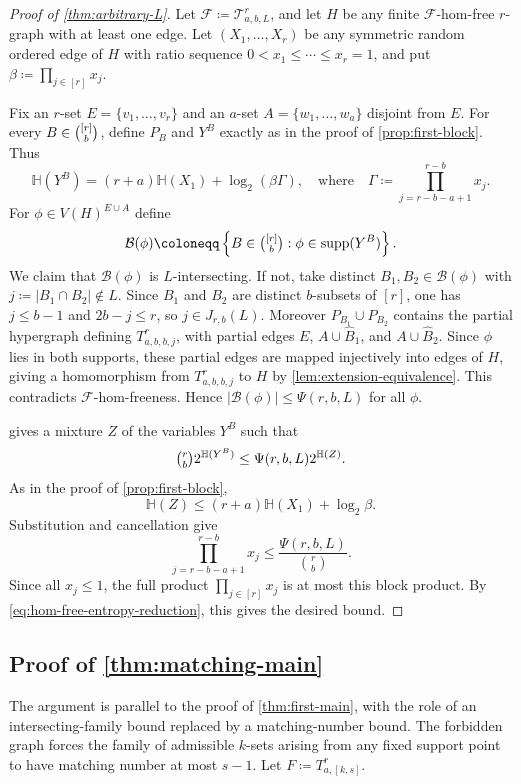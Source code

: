 \documentclass[10pt,a4paper]{article}
\theoremstyle{plain}
\theoremstyle{definition}
\theoremstyle{plain}
\DeclareMathOperator{\supp}{supp}
\newcommand{\calB}{\mathcal B}
\newcommand{\calF}{\mathcal F}
\newcommand{\calT}{\mathcal T}
\newcommand{\HH}{\mathbb H}
\begin{document}
\begin{proof}[Proof of \cref{thm:arbitrary-L}]
Let $\calF\coloneqq\calT^r_{a,b,L}$, and let $H$ be any finite $\calF$-hom-free
$r$-graph with at least one edge.  Let $(X_1,\ldots,X_r)$ be any symmetric random ordered edge of $H$
with ratio sequence $0<x_1\le\cdots\le x_r=1$, and put
$\beta\coloneqq\prod_{j\in [r]} x_j$.

Fix an $r$-set $E=\{v_1,\ldots,v_r\}$ and an $a$-set
$A=\{w_1,\ldots,w_a\}$ disjoint from $E$.  For every
$B\in\tbinom{[r]}{b}$, define $P_B$ and $Y^B$ exactly as in the proof of
\cref{prop:first-block}.  Thus
\[
        \HH(Y^B)=(r+a)\HH(X_1)+\log_2(\beta\Gamma),
        \quad\text{where}\quad
        \Gamma\coloneqq\prod_{j=r-b-a+1}^{r-b}x_j.
\]
For $\phi\in V(H)^{E\cup A}$ define
\[
        \calB(\phi)\coloneqq\left\{B\in\tbinom{[r]}{b}:\phi\in\supp(Y^B)\right\}.
\]
We claim that $\calB(\phi)$ is $L$-intersecting.  If not, take distinct
$B_1,B_2\in\calB(\phi)$ with $j\coloneqq |B_1\cap B_2|\notin L$.  Since
$B_1$ and $B_2$ are distinct $b$-subsets of $[r]$, one has $j\le b-1$ and
$2b-j\le r$, so $j\in J_{r,b}(L)$.  Moreover
$P_{B_1}\cup P_{B_2}$ contains the partial hypergraph defining
$T^r_{a,b,b,j}$, with partial edges $E$, $A\cup\hat{B}_1$, and
$A\cup\hat{B}_2$.  Since $\phi$ lies in both supports, these partial
edges are mapped injectively into edges of $H$, giving a homomorphism from
$T^r_{a,b,b,j}$ to $H$ by \cref{lem:extension-equivalence}.  This contradicts
$\calF$-hom-freeness.  Hence $|\calB(\phi)|\le\Psi(r,b,L)$ for all $\phi$.

 gives a mixture $Z$ of the variables $Y^B$ such that
\[
        \tbinom{r}{b}2^{\HH(Y^B)}
        \le \Psi(r,b,L)2^{\HH(Z)}.
\]
As in the proof of \cref{prop:first-block},
\[
        \HH(Z)\le (r+a)\HH(X_1)+\log_2\beta.
\]
Substitution and cancellation give
\[
        \prod_{j=r-b-a+1}^{r-b}x_j
        \le \frac{\Psi(r,b,L)}{\binom{r}{b}}.
\]
Since all $x_j\le1$, the full product $\prod_{j\in [r]} x_j$ is at most this
block product.  By \cref{eq:hom-free-entropy-reduction}, this gives the desired
bound.
\end{proof}

\subsection{Proof of \texorpdfstring{\cref{thm:matching-main}}{Theorem 1.3}}

The argument is parallel to the proof of \cref{thm:first-main}, with the role of an intersecting-family bound replaced by a matching-number bound.  The forbidden graph forces the family of admissible $k$-sets arising from any fixed support point to have matching number at most $s-1$.  Let $F\coloneqq T^r_{a,[k,s]}$.
\end{document}
